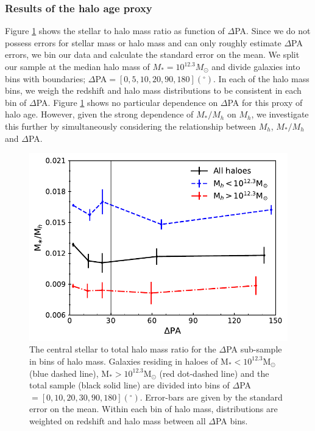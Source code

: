 \subsubsection{Results of the halo age proxy}
Figure \ref{fig:2d_ratio} shows the stellar to halo mass ratio as function of $\Delta$PA. Since we do not possess errors for stellar mass or halo mass and can only roughly estimate $\Delta$PA errors, we bin our data and calculate the standard error on the mean. We split our sample at the median halo mass of $M_{\ast} = 10^{12.3} M_{\odot}$ and divide galaxies into bins with boundaries; $\Delta$PA$ = [0,5,10,20,90,180] (^{\circ})$. In each of the halo mass bins, we weigh the redshift and halo mass distributions to be consistent in each bin of $\Delta$PA. Figure \ref{fig:2d_ratio} shows no particular dependence on $\Delta$PA for this proxy of halo age. However, given the strong dependence of $M_{\ast}/M_{h}$ on $M_{h}$, we investigate this further by simultaneously considering the relationship between $M_{h}$, $M_{\ast}/M_{h}$ and $\Delta$PA. 

\begin{figure}
    \centering
	\includegraphics[width=0.8\linewidth]{thesis/latex/halo_assembly_manga/stel_halo_ratio_bin0_10_20_30_90.pdf}
    \caption[The central stellar to total halo mass ratio for the $\Delta$PA sub-sample.]{The central stellar to total halo mass ratio for the $\Delta$PA sub-sample in bins of halo mass. Galaxies residing in haloes of M$_{\ast} < 10^{12.3}$M$_{\odot}$ (blue dashed line), M$_{\ast} > 10^{12.3}$M$_{\odot}$ (red dot-dashed line) and the total sample (black solid line) are divided into bins of $\Delta$PA$ = [0,10,20,30,90,180] (^{\circ})$. Error-bars are given by the standard error on the mean. Within each bin of halo mass, distributions are weighted on redshift and halo mass between all $\Delta$PA bins.}
    \label{fig:2d_ratio}
\end{figure}

